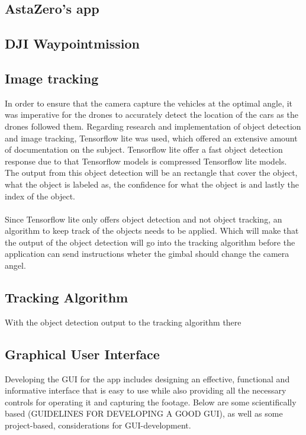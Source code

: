 \subsection{AstaZero's app}
\subsection{DJI Waypointmission}



\subsection{Image tracking}
In order to ensure that the camera capture the vehicles at the optimal angle, it was imperative for the drones to accurately detect the location of the cars as the drones followed them. Regarding research and implementation of object detection and image tracking, Tensorflow lite was used, which offered an extensive amount of documentation on the subject. Tensorflow lite offer a fast object detection response due to that Tensorflow models is compressed Tensorflow lite models. The output from this object detection will be an rectangle that cover the object, what the object is labeled as, the confidence for what the object is and lastly the index of the object.
\\ \\
Since Tensorflow lite only offers object detection and not object tracking, an algorithm to keep track of the objects needs to be applied. Which will make that the output of the object detection will go into the tracking algorithm before the application can send instructions wheter the gimbal should change the camera angel.

\subsection{Tracking Algorithm}
With the object detection output to the tracking algorithm there 


\subsection{Graphical User Interface}
Developing the GUI for the app includes designing an effective, functional and informative interface that is easy to use while also providing all the necessary controls for operating it and capturing the footage. Below are some scientifically based (GUIDELINES FOR DEVELOPING A GOOD GUI), as well as some project-based, considerations for GUI-development. 
\\


